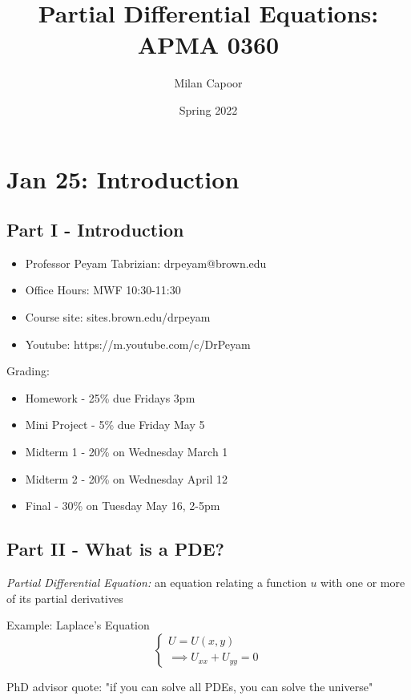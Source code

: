 \documentclass[12pt]{article}
\title{Partial Differential Equations: APMA 0360}
\author{Milan Capoor}
\date{Spring 2022}
\begin{document}
\maketitle
\section{Jan 25: Introduction}
\subsection*{Part I - Introduction}

\begin{itemize}
    \item Professor Peyam Tabrizian: drpeyam@brown.edu
    \item Office Hours: MWF 10:30-11:30
    \item Course site: sites.brown.edu/drpeyam
    \item Youtube: https://m.youtube.com/c/DrPeyam
\end{itemize}

Grading:
\begin{itemize}
    \item Homework - 25\% due Fridays 3pm
    \item Mini Project - 5\% due Friday May 5
    \item Midterm 1 - 20\% on Wednesday March 1
    \item Midterm 2 - 20\% on Wednesday April 12
    \item Final - 30\% on Tuesday May 16, 2-5pm 
\end{itemize}

\subsection*{Part II - What is a PDE?}
\emph{Partial Differential Equation:} an equation relating a function $u$ with one or more of its partial derivatives

Example: Laplace's Equation
\[\begin{cases}
    U = U(x, y)\\
    \implies U_{xx} + U_{yy} = 0
\end{cases}\]

PhD advisor quote: "if you can solve all PDEs, you can solve the universe"
\end{document}
